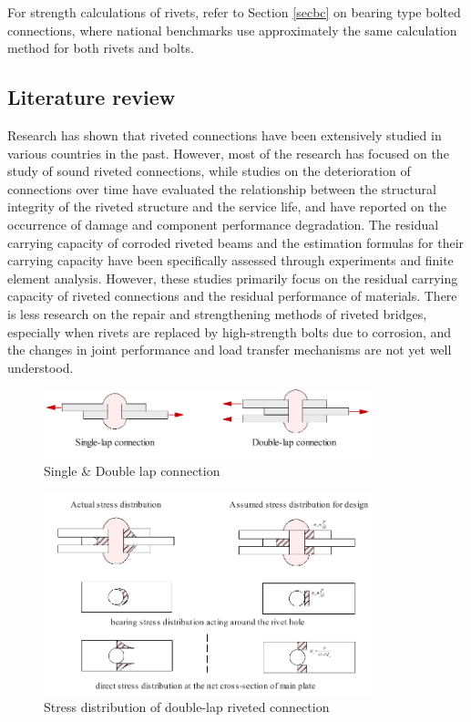 For strength calculations of rivets, refer to Section \ref{secbc} on bearing type bolted connections, where national benchmarks use approximately the same calculation method for both rivets and bolts.


\subsection{Literature review}

Research has shown that riveted connections have been extensively studied in various countries in the past. However, most of the research has focused on the study of sound riveted connections, while studies on the deterioration of connections over time have evaluated the relationship between the structural integrity of the riveted structure and the service life, and have reported on the occurrence of damage and component performance degradation. The residual carrying capacity of corroded riveted beams and the estimation formulas for their carrying capacity have been specifically assessed through experiments and finite element analysis. However, these studies primarily focus on the residual carrying capacity of riveted connections and the residual performance of materials. There is less research on the repair and strengthening methods of riveted bridges, especially when rivets are replaced by high-strength bolts due to corrosion, and the changes in joint performance and load transfer mechanisms are not yet well understood.

\begin{figure}[htbp]
    \centering
    \includegraphics[width=0.85\textwidth]{imgs/ch2/lap-connec.pdf}
    \caption{Single \& Double lap connection}
    \label{fig-lapconnec}
\end{figure}


\begin{figure}[htbp]
    \centering
    \includegraphics[width=0.85\textwidth]{imgs/ch2/bstressdistr-0.pdf}
    \caption{Stress distribution of double-lap riveted connection}
    \label{fig-rsdisri}
\end{figure}





